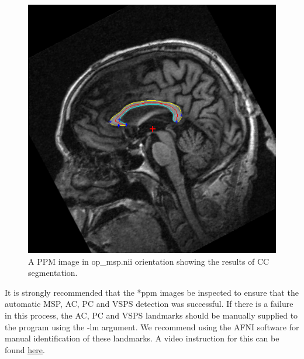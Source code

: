 \documentclass[11pt]{article}
\begin{document}
\begin{figure}[H]
\begin{center}
\includegraphics[scale=.5]{op_cc.jpg}
\caption{
A PPM image in op\_msp.nii orientation showing the results of CC
segmentation.  
}
\label{fig:op}
\end{center}
\end{figure}

It is strongly recommended that the *ppm images be inspected to ensure that 
the automatic MSP, AC, PC and VSPS detection was successful.  
If there is a failure in this process, the AC, PC and VSPS landmarks should be
manually supplied to the program  using the -lm argument. 
We recommend
using the AFNI software for manual identification of these landmarks. 
A video instruction for this can be found 
\href{https://www.youtube.com/watch?v=q5GBaNnjOa8}{\underline{here}}.


\end{document}
